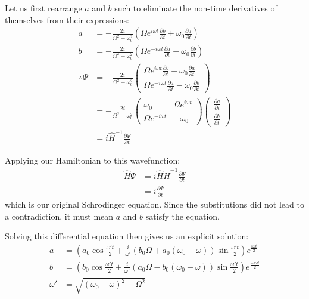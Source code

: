 \documentclass[a4paper]{scrartcl}
\begin{document}
Let us first rearrange \(a\) and \(b\) such to eliminate the non-time derivatives of themselves from their expressions:
\begin{align*}
    a &= -\frac{2 i}{\Omega^2 + \omega_0^2} \left(\Omega e^{i \omega t} \frac{\partial b}{\partial t} + \omega_0 \frac{\partial a}{\partial t}\right) \\
    b &= -\frac{2 i}{\Omega^2 + \omega_0^2} \left(\Omega e^{-i \omega t} \frac{\partial a}{\partial t} - \omega_0 \frac{\partial b}{\partial t}\right) \\
    \therefore \Psi &= -\frac{2 i}{\Omega^2 + \omega_0^2} \begin{pmatrix}
        \Omega e^{i \omega t} \frac{\partial b}{\partial t} + \omega_0 \frac{\partial a}{\partial t} \\
        \Omega e^{-i \omega t} \frac{\partial a}{\partial t} - \omega_0 \frac{\partial b}{\partial t}
    \end{pmatrix} \\
    &= -\frac{2 i}{\Omega^2 + \omega_0^2} \begin{pmatrix}
        \omega_0 & \Omega e^{i \omega t} \\
        \Omega e^{-i \omega t} & -\omega_0
    \end{pmatrix} \begin{pmatrix}
        \frac{\partial a}{\partial t} \\
        \frac{\partial b}{\partial t}
    \end{pmatrix} \\
    &= i \hat{H}^{-1} \frac{\partial \Psi}{\partial t}
\end{align*}

Applying our Hamiltonian to this wavefunction:
\begin{align*}
    \hat{H} \Psi &= i \hat{H} \hat{H}^{-1} \frac{\partial \Psi}{\partial t} \\
    &= i \frac{\partial \Psi}{\partial t}
\end{align*}
which is our original Schrodinger equation. Since the substitutions did not lead to a contradiction, it must mean \(a\) and \(b\) satisfy the equation.

Solving this differential equation then gives us an explicit solution:
\begin{align*}
    a &= \left(a_0 \cos \frac{\omega' t}{2} + \frac{i}{\omega'} \left(b_0 \Omega + a_0 (\omega_0 - \omega)\right) \sin \frac{\omega' t}{2}\right) e^{\frac{i \omega t}{2}} \\
    b &= \left(b_0 \cos \frac{\omega' t}{2} + \frac{i}{\omega'} \left(a_0 \Omega - b_0 (\omega_0 - \omega)\right) \sin \frac{\omega' t}{2}\right) e^{\frac{-i \omega t}{2}} \\
    \omega' &= \sqrt{(\omega_0 - \omega)^2 + \Omega^2}
\end{align*}
\end{document}
